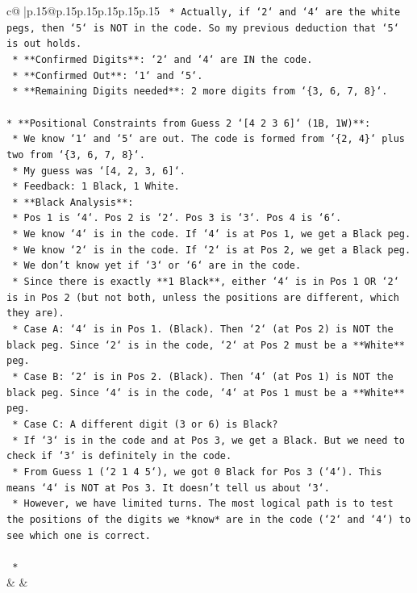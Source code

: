 \documentclass{article}
\begin{document}
{\begin{supertabular}{c@{$\;$}|p{.15\linewidth}@{}p{.15\linewidth}p{.15\linewidth}p{.15\linewidth}p{.15\linewidth}p{.15\linewidth}}
{{{\texttt{        *   Actually, if `2` and `4` are the white pegs, then `5` is NOT in the code. So my previous deduction that `5` is out holds.} \\
\texttt{        *   **Confirmed Digits**: `2` and `4` are IN the code.} \\
\texttt{        *   **Confirmed Out**: `1` and `5`.} \\
\texttt{        *   **Remaining Digits needed**: 2 more digits from `\{3, 6, 7, 8\}`.} \\
\\ 
\texttt{*   **Positional Constraints from Guess 2 `{[}4 2 3 6{]}` (1B, 1W)**:} \\
\texttt{    *   We know `1` and `5` are out. The code is formed from `\{2, 4\}` plus two from `\{3, 6, 7, 8\}`.} \\
\texttt{    *   My guess was `{[}4, 2, 3, 6{]}`.} \\
\texttt{    *   Feedback: 1 Black, 1 White.} \\
\texttt{    *   **Black Analysis**:} \\
\texttt{        *   Pos 1 is `4`. Pos 2 is `2`. Pos 3 is `3`. Pos 4 is `6`.} \\
\texttt{        *   We know `4` is in the code. If `4` is at Pos 1, we get a Black peg.} \\
\texttt{        *   We know `2` is in the code. If `2` is at Pos 2, we get a Black peg.} \\
\texttt{        *   We don't know yet if `3` or `6` are in the code.} \\
\texttt{        *   Since there is exactly **1 Black**, either `4` is in Pos 1 OR `2` is in Pos 2 (but not both, unless the positions are different, which they are).} \\
\texttt{            *   Case A: `4` is in Pos 1. (Black). Then `2` (at Pos 2) is NOT the black peg. Since `2` is in the code, `2` at Pos 2 must be a **White** peg.} \\
\texttt{            *   Case B: `2` is in Pos 2. (Black). Then `4` (at Pos 1) is NOT the black peg. Since `4` is in the code, `4` at Pos 1 must be a **White** peg.} \\
\texttt{            *   Case C: A different digit (3 or 6) is Black?} \\
\texttt{                *   If `3` is in the code and at Pos 3, we get a Black. But we need to check if `3` is definitely in the code.} \\
\texttt{                *   From Guess 1 (`2 1 4 5`), we got 0 Black for Pos 3 (`4`). This means `4` is NOT at Pos 3. It doesn't tell us about `3`.} \\
\texttt{                *   However, we have limited turns. The most logical path is to test the positions of the digits we *know* are in the code (`2` and `4`) to see which one is correct.} \\
\\ 
\texttt{    *} \\
            }
        }
    }
    & & \\ \\


\end{supertabular}}
\end{document}
